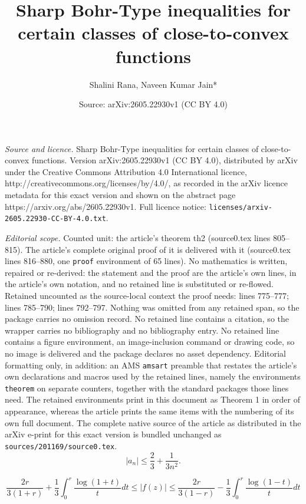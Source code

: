 \documentclass[10pt,a4paper]{amsart}
\title{Sharp Bohr-Type inequalities for certain classes of close-to-convex functions}
\author{Shalini Rana, Naveen Kumar Jain*}
\date{Source: arXiv:2605.22930v1 (CC BY 4.0)}
\begin{document}
\maketitle

\noindent\emph{Source and licence.} Sharp Bohr-Type inequalities for certain classes of close-to-convex functions. Version arXiv:2605.22930v1 (CC BY 4.0), distributed by arXiv under the Creative Commons Attribution 4.0 International licence, http://creativecommons.org/licenses/by/4.0/, as recorded in the arXiv licence metadata for this exact version and shown on the abstract page https://arxiv.org/abs/2605.22930v1. Full licence notice: \texttt{licenses/arxiv-2605.22930-CC-BY-4.0.txt}.\par\smallskip

\noindent\textit{Editorial scope.} Counted unit: the article's theorem th2 (source0.tex lines 805--815). The article's complete original proof of it is delivered with it (source0.tex lines 816--880, one \texttt{proof} environment of 65 lines). No mathematics is written, repaired or re-derived: the statement and the proof are the article's own lines, in the article's own notation, and no retained line is substituted or re-flowed.  Retained uncounted as the source-local context the proof needs: lines 775--777; lines 785--790; lines 792--797.  Nothing was omitted from any retained span, so the package carries no omission record.  No retained line contains a citation, so the wrapper carries no bibliography and no bibliography entry.  No retained line contains a figure environment, an image-inclusion command or drawing code, so no image is delivered and the package declares no asset dependency.  Editorial formatting only, in addition: an AMS \texttt{amsart} preamble that restates the article's own declarations and macros used by the retained lines, namely the environments \texttt{theorem} on separate counters, together with the standard packages those lines need.  The retained environments print in this document as Theorem 1 in order of appearance, whereas the article prints the same items with the numbering of its own full document.  The complete native source of the article as distributed in the arXiv e-print for this exact version is bundled unchanged as \texttt{sources/201169/source0.tex}.
\begin{equation}\label{coef3}
 |a_n| \le \frac{2}{3} + \frac{1}{3n^2}  .
\end{equation}

\begin{equation}
\frac{2r}{3(1+r)}+\frac{1}{3} \int_{0}^{r} \frac{\log(1+t)}{t} dt
\le |f(z)|
\le \frac{2r}{3(1-r)}-\frac{1}{3} \int_{0}^{r} \frac{\log(1-t)}{t} dt
\label{growth3}
\end{equation}
\end{document}
